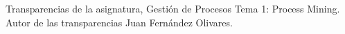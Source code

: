 % 

\begin{thebibliography}{99}

\emph{}Transparencias de la asignatura, Gesti\'on de Procesos Tema 1: Process Mining. Autor de las transparencias Juan Fern\'andez Olivares.

\end{thebibliography}

